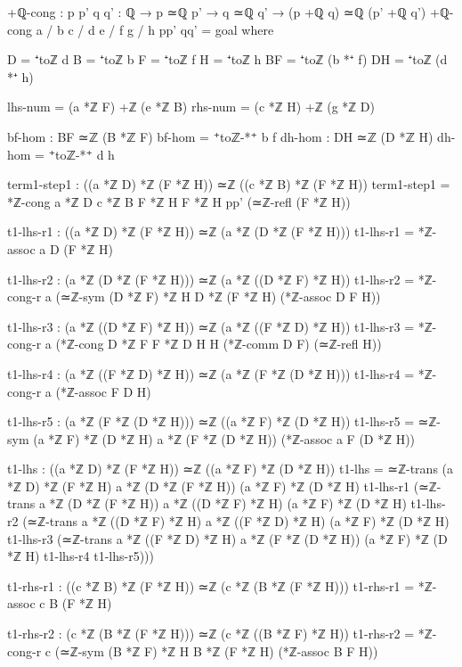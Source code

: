 \documentclass[11pt,a4paper]{book}
\begin{document}
\begin{code}
+ℚ-cong : {p p' q q' : ℚ} → p ≃ℚ p' → q ≃ℚ q' → (p +ℚ q) ≃ℚ (p' +ℚ q')
+ℚ-cong {a / b} {c / d} {e / f} {g / h} pp' qq' = goal
  where
    
    D = ⁺toℤ d
    B = ⁺toℤ b
    F = ⁺toℤ f
    H = ⁺toℤ h
    BF = ⁺toℤ (b *⁺ f)
    DH = ⁺toℤ (d *⁺ h)
    
    lhs-num = (a *ℤ F) +ℤ (e *ℤ B)
    rhs-num = (c *ℤ H) +ℤ (g *ℤ D)
    
    bf-hom : BF ≃ℤ (B *ℤ F)
    bf-hom = ⁺toℤ-*⁺ b f
    dh-hom : DH ≃ℤ (D *ℤ H)
    dh-hom = ⁺toℤ-*⁺ d h

    term1-step1 : ((a *ℤ D) *ℤ (F *ℤ H)) ≃ℤ ((c *ℤ B) *ℤ (F *ℤ H))
    term1-step1 = *ℤ-cong {a *ℤ D} {c *ℤ B} {F *ℤ H} {F *ℤ H} pp' (≃ℤ-refl (F *ℤ H))
    
    t1-lhs-r1 : ((a *ℤ D) *ℤ (F *ℤ H)) ≃ℤ (a *ℤ (D *ℤ (F *ℤ H)))
    t1-lhs-r1 = *ℤ-assoc a D (F *ℤ H)
    
    t1-lhs-r2 : (a *ℤ (D *ℤ (F *ℤ H))) ≃ℤ (a *ℤ ((D *ℤ F) *ℤ H))
    t1-lhs-r2 = *ℤ-cong-r a (≃ℤ-sym {(D *ℤ F) *ℤ H} {D *ℤ (F *ℤ H)} (*ℤ-assoc D F H))
    
    t1-lhs-r3 : (a *ℤ ((D *ℤ F) *ℤ H)) ≃ℤ (a *ℤ ((F *ℤ D) *ℤ H))
    t1-lhs-r3 = *ℤ-cong-r a (*ℤ-cong {D *ℤ F} {F *ℤ D} {H} {H} (*ℤ-comm D F) (≃ℤ-refl H))
    
    t1-lhs-r4 : (a *ℤ ((F *ℤ D) *ℤ H)) ≃ℤ (a *ℤ (F *ℤ (D *ℤ H)))
    t1-lhs-r4 = *ℤ-cong-r a (*ℤ-assoc F D H)
    
    t1-lhs-r5 : (a *ℤ (F *ℤ (D *ℤ H))) ≃ℤ ((a *ℤ F) *ℤ (D *ℤ H))
    t1-lhs-r5 = ≃ℤ-sym {(a *ℤ F) *ℤ (D *ℤ H)} {a *ℤ (F *ℤ (D *ℤ H))} (*ℤ-assoc a F (D *ℤ H))
    
    t1-lhs : ((a *ℤ D) *ℤ (F *ℤ H)) ≃ℤ ((a *ℤ F) *ℤ (D *ℤ H))
    t1-lhs = ≃ℤ-trans {(a *ℤ D) *ℤ (F *ℤ H)} {a *ℤ (D *ℤ (F *ℤ H))} {(a *ℤ F) *ℤ (D *ℤ H)} t1-lhs-r1
             (≃ℤ-trans {a *ℤ (D *ℤ (F *ℤ H))} {a *ℤ ((D *ℤ F) *ℤ H)} {(a *ℤ F) *ℤ (D *ℤ H)} t1-lhs-r2
             (≃ℤ-trans {a *ℤ ((D *ℤ F) *ℤ H)} {a *ℤ ((F *ℤ D) *ℤ H)} {(a *ℤ F) *ℤ (D *ℤ H)} t1-lhs-r3
             (≃ℤ-trans {a *ℤ ((F *ℤ D) *ℤ H)} {a *ℤ (F *ℤ (D *ℤ H))} {(a *ℤ F) *ℤ (D *ℤ H)} t1-lhs-r4 t1-lhs-r5)))
    
    t1-rhs-r1 : ((c *ℤ B) *ℤ (F *ℤ H)) ≃ℤ (c *ℤ (B *ℤ (F *ℤ H)))
    t1-rhs-r1 = *ℤ-assoc c B (F *ℤ H)
    
    t1-rhs-r2 : (c *ℤ (B *ℤ (F *ℤ H))) ≃ℤ (c *ℤ ((B *ℤ F) *ℤ H))
    t1-rhs-r2 = *ℤ-cong-r c (≃ℤ-sym {(B *ℤ F) *ℤ H} {B *ℤ (F *ℤ H)} (*ℤ-assoc B F H))
    

\end{code}
\end{document}
